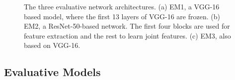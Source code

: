 \begin{figure}[t!]
\centering


\caption{The three evaluative network architectures. (a) EM1, a VGG-16 based model, where the first 13 layers of VGG-16 are frozen. (b) EM2, a ResNet-50-based network. The first four blocks are used for feature extraction and the rest to learn joint features. (c) EM3, also based on VGG-16.}
\label{fig:networkArchitecture2}
\end{figure}

\subsection{Evaluative Models}

